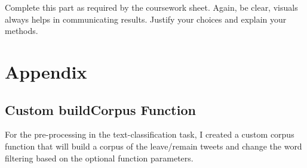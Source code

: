 \documentclass[10pt  ,usenames, dvipsnames]{article}\usepackage[]{graphicx}\usepackage[]{color}
\begin{document}
Complete this part as required by the coursework sheet. Again, be clear, visuals always helps in communicating results. Justify your choices and explain your methods. 


\clearpage

\section{Appendix}

\subsection{Custom buildCorpus Function}
For the pre-processing in the text-classification task, I created a custom corpus function that will build a corpus of the leave/remain tweets and change the word filtering based on the optional function parameters.
\end{document}
